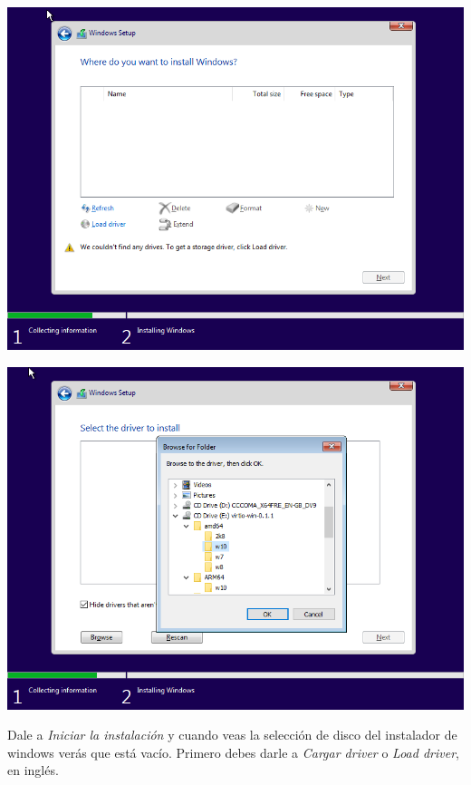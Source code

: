 \documentclass[12pt]{article}
\begin{document}
\begin{multicols}{2}
\begin{minipage}[t]{\linewidth}%
\vspace{0pt}
\centering
\includegraphics[width=\textwidth]{images/windows-setup-01.png}
\end{minipage}
\begin{minipage}[t]{\linewidth}%
\vspace{0pt}
\centering
\includegraphics[width=\textwidth]{images/windows-setup-02.png}
\end{minipage}
\end{multicols}

Dale a \emph{Iniciar la instalación} y cuando veas la selección de disco del instalador de windows verás que está vacío. Primero debes darle a \emph{Cargar driver} o \emph{Load driver}, en inglés.
\end{document}
